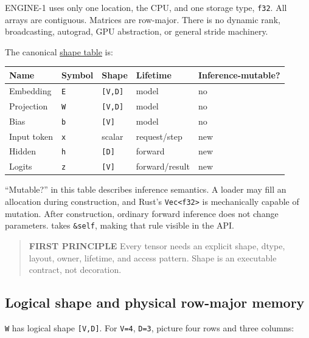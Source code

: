 \documentclass[
  10pt,
]{article}
\newcounter{none} %
\begin{document}
ENGINE-1 uses only one location, the CPU, and one storage type,
\texttt{f32}. All arrays are contiguous. Matrices are row-major. There
is no dynamic rank, broadcasting, autograd, GPU abstraction, or general
stride machinery.

The canonical
\href{https://github.com/hermonai/inside-the-llm-engine/blob/astra-visual-rewrite/diagrams/model/tiny-model-tensor-shapes.txt}{shape
table} is:

{\def\LTcaptype{none} %
\begin{longtable}[]{@{}lllll@{}}
\toprule\noalign{}
Name & Symbol & Shape & Lifetime & Inference-mutable? \\
\midrule\noalign{}
\endhead
\bottomrule\noalign{}
\endlastfoot
Embedding & \texttt{E} & \texttt{{[}V,D{]}} & model & no \\
Projection & \texttt{W} & \texttt{{[}V,D{]}} & model & no \\
Bias & \texttt{b} & \texttt{{[}V{]}} & model & no \\
Input token & \texttt{x} & scalar & request/step & new \\
Hidden & \texttt{h} & \texttt{{[}D{]}} & forward & new \\
Logits & \texttt{z} & \texttt{{[}V{]}} & forward/result & new \\
\end{longtable}
}

``Mutable?'' in this table describes inference semantics. A loader may
fill an allocation during construction, and Rust's
\texttt{Vec\textless{}f32\textgreater{}} is mechanically capable of
mutation. After construction, ordinary forward inference does not change
parameters. \texttt{} takes
\texttt{\&self}, making that rule visible in the API.

\begin{quote}
\textbf{FIRST PRINCIPLE} Every tensor needs an explicit shape, dtype,
layout, owner, lifetime, and access pattern. Shape is an executable
contract, not decoration.
\end{quote}

\subsection{Logical shape and physical row-major
memory}\label{logical-shape-and-physical-row-major-memory}

\texttt{W} has logical shape \texttt{{[}V,D{]}}. For \texttt{V=4},
\texttt{D=3}, picture four rows and three columns:
\end{document}
